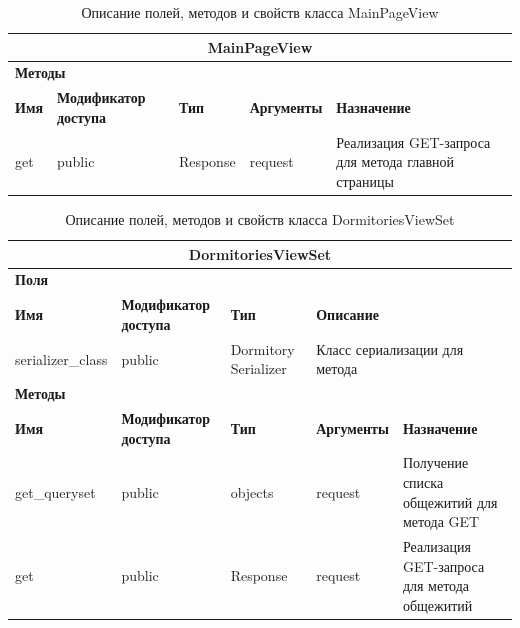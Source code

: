 \documentclass{../includes/TechDoc}
\begin{document}
    \begin{table}[ht]
        \caption{\label{tab:class-MainPageView-table}Описание полей, методов и свойств класса MainPageView}
        \centering
        \begin{tabular}{|p{3.2cm}|p{3cm}|p{2.9cm}|p{2.9cm}|p{4cm}|}
            \hline
            \multicolumn{5}{|c|}{MainPageView} \\ \hline
            \multicolumn{5}{|l|}{\textbf{Методы}} \\ \hline
            \textbf{Имя} & \textbf{Модификатор доступа} & \textbf{Тип} & \textbf{Аргументы} & \textbf{Назначение} \\ \hline
            get & public & Response & request & Реализация GET-запроса для метода главной страницы \\ \hline
        \end{tabular}
    \end{table}

    \begin{table}[ht]
        \caption{\label{tab:class-DormitoriesViewSet-table}Описание полей, методов и свойств класса DormitoriesViewSet}
        \centering
        \begin{tabular}{|p{3.2cm}|p{3cm}|p{2.9cm}|p{2.9cm}|p{4cm}|}
            \hline
            \multicolumn{5}{|c|}{DormitoriesViewSet} \\ \hline
            \multicolumn{5}{|l|}{\textbf{Поля}} \\ \hline
            \textbf{Имя} & \textbf{Модификатор доступа} & \textbf{Тип} & \multicolumn{2}{p{6.9cm}|}{\textbf{Описание}} \\ \hline
            serializer\_class & public & Dormitory Serializer & \multicolumn{2}{p{6.9cm}|}{Класс сериализации для метода} \\ \hline
            \multicolumn{5}{|l|}{\textbf{Методы}} \\ \hline
            \textbf{Имя} & \textbf{Модификатор доступа} & \textbf{Тип} & \textbf{Аргументы} & \textbf{Назначение} \\ \hline
            get\_queryset & public & objects & request & Получение списка общежитий для метода GET \\ \hline
            get & public & Response & request & Реализация GET-запроса для метода общежитий \\ \hline
        \end{tabular}
    \end{table}
\end{document}
